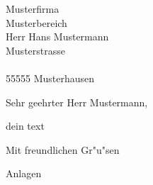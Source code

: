 \documentclass[ebner,paper=a4,fontsize=11pt,ngerman,BCOR=10mm]{scrlttr2}%
\begin{document}
\pagestyle{empty}
\begin{letter}{Musterfirma\\Musterbereich\\ Herr Hans Mustermann\\Musterstrasse\\\\55555 Musterhausen}



\opening{Sehr geehrter Herr Mustermann,}

dein text

\closing{Mit freundlichen Gr"u"sen}
\enlargethispage{6\baselineskip}

\medskip
\noindent Anlagen


\end{letter}
\end{document}
